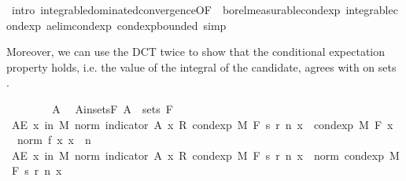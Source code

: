 \begin{isabellebody}
\ {\isacharparenleft}{\kern0pt}intro\ integrable{\isacharunderscore}{\kern0pt}dominated{\isacharunderscore}{\kern0pt}convergence{\isacharbrackleft}{\kern0pt}OF\ {\isacharunderscore}{\kern0pt}\ borel{\isacharunderscore}{\kern0pt}measurable{\isacharunderscore}{\kern0pt}cond{\isacharunderscore}{\kern0pt}exp{\isacharprime}{\kern0pt}\ integrable{\isacharunderscore}{\kern0pt}cond{\isacharunderscore}{\kern0pt}exp\ ae{\isacharunderscore}{\kern0pt}lim{\isacharunderscore}{\kern0pt}cond{\isacharunderscore}{\kern0pt}exp\ cond{\isacharunderscore}{\kern0pt}exp{\isacharunderscore}{\kern0pt}bounded{\isacharbrackright}{\kern0pt}{\isacharcomma}{\kern0pt}\ simp{\isacharparenright}{\kern0pt}%
\begin{isamarkuptext}%
Moreover, we can use the DCT twice to show that the conditional expectation property holds, i.e. the value of the integral of the candidate, agrees with  on sets .%
\end{isamarkuptext}\isamarkuptrue%
\ \ \isacommand{{\isacharbraceleft}{\kern0pt}}\isamarkupfalse%
\isanewline
\ \ \ \ \isamarkupfalse%
\ A\ \isamarkupfalse%
\ A{\isacharunderscore}{\kern0pt}in{\isacharunderscore}{\kern0pt}sets{\isacharunderscore}{\kern0pt}F{\isacharcolon}{\kern0pt}\ {\isachardoublequoteopen}A\ {\isasymin}\ sets\ F{\isachardoublequoteclose}\isanewline
\ \ \ \ \isamarkupfalse%
\ {\isachardoublequoteopen}AE\ x\ in\ M{\isachardot}{\kern0pt}\ norm\ {\isacharparenleft}{\kern0pt}indicator\ A\ x\ {\isacharasterisk}{\kern0pt}\isactrlsub R\ cond{\isacharunderscore}{\kern0pt}exp\ M\ F\ {\isacharparenleft}{\kern0pt}s\ {\isacharparenleft}{\kern0pt}r\ n{\isacharparenright}{\kern0pt}{\isacharparenright}{\kern0pt}\ x{\isacharparenright}{\kern0pt}\ {\isasymle}\ cond{\isacharunderscore}{\kern0pt}exp\ M\ F\ {\isacharparenleft}{\kern0pt}{\isasymlambda}x{\isachardot}{\kern0pt}\ {}\ {\isacharasterisk}{\kern0pt}\ norm\ {\isacharparenleft}{\kern0pt}f\ x{\isacharparenright}{\kern0pt}{\isacharparenright}{\kern0pt}\ x{\isachardoublequoteclose}\ \ n\isanewline
\ \ \ \ \isamarkupfalse%
\ {\isacharminus}{\kern0pt}\isanewline
\ \ \ \ \ \ \isamarkupfalse%
\ {\isachardoublequoteopen}AE\ x\ in\ M{\isachardot}{\kern0pt}\ norm\ {\isacharparenleft}{\kern0pt}indicator\ A\ x\ {\isacharasterisk}{\kern0pt}\isactrlsub R\ cond{\isacharunderscore}{\kern0pt}exp\ M\ F\ {\isacharparenleft}{\kern0pt}s\ {\isacharparenleft}{\kern0pt}r\ n{\isacharparenright}{\kern0pt}{\isacharparenright}{\kern0pt}\ x{\isacharparenright}{\kern0pt}\ {\isasymle}\ norm\ {\isacharparenleft}{\kern0pt}cond{\isacharunderscore}{\kern0pt}exp\ M\ F\ {\isacharparenleft}{\kern0pt}s\ {\isacharparenleft}{\kern0pt}r\ n{\isacharparenright}{\kern0pt}{\isacharparenright}{\kern0pt}\ x{\isacharparenright}{\kern0pt}{\isachardoublequoteclose}\ \isamarkupfalse%

\end{isabellebody}
